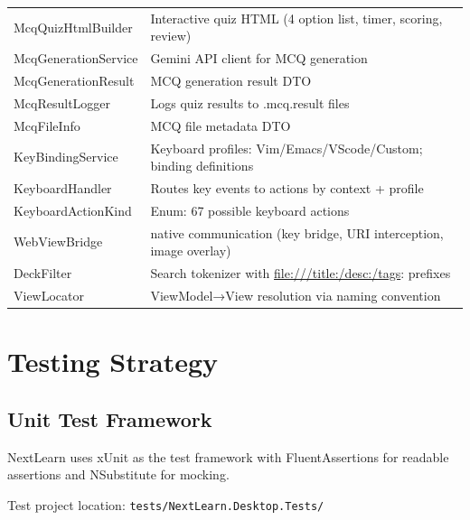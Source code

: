 \documentclass[14pt]{article}
\begin{document}
\begin{center}
\begin{tabular}{ll}
McqQuizHtmlBuilder & Interactive quiz HTML (4 option list, timer, scoring, review)\\
McqGenerationService & Gemini API client for MCQ generation\\
McqGenerationResult & MCQ generation result DTO\\
McqResultLogger & Logs quiz results to .mcq.result files\\
McqFileInfo & MCQ file metadata DTO\\
KeyBindingService & Keyboard profiles: Vim/Emacs/VScode/Custom; binding definitions\\
KeyboardHandler & Routes key events to actions by context + profile\\
KeyboardActionKind & Enum: 67 possible keyboard actions\\
WebViewBridge & native communication (key bridge, URI interception, image overlay)\\
DeckFilter & Search tokenizer with \url{file:///title:/desc:/tags}: prefixes\\
ViewLocator & ViewModel→View resolution via naming convention\\
\end{tabular}
\end{center}


\newpage
\section{Testing Strategy}
\label{sec:orgcbfdf75}
\subsection{Unit Test Framework}
\label{sec:orga8d9fc3}
NextLearn uses xUnit as the test framework with FluentAssertions for
readable assertions and NSubstitute for mocking.

Test project location: \texttt{tests/NextLearn.Desktop.Tests/}
\end{document}
